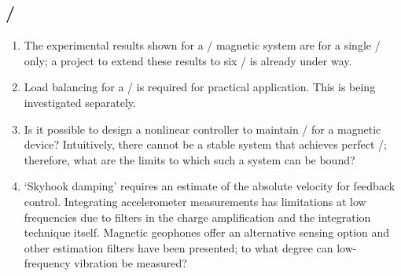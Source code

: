 \documentclass[10pt,a4paper]{memoir}
\begin{document}
\subsection{\QZS/}

\begin{enumerate}

\item
The experimental results shown for a \qzs/ magnetic system are for a single \dof/ only; a project to extend these results to six \dof/ is already under way.

\item
Load balancing for a \qzs/ is required for practical application.
This is being investigated separately.

\item
Is it possible to design a nonlinear controller to maintain \qzs/ for a magnetic device?
Intuitively, there cannot be a stable system that achieves perfect \qzs/; therefore, what are the limits to which such a system can be bound?

\item
`Skyhook damping' requires an estimate of the absolute velocity for feedback control.
Integrating accelerometer measurements has limitations at low frequencies due to filters in the charge amplification and the integration technique itself.
Magnetic geophones offer an alternative sensing option and other estimation filters have been presented; to what degree can low-frequency vibration be measured?
\end{enumerate}
\end{document}
